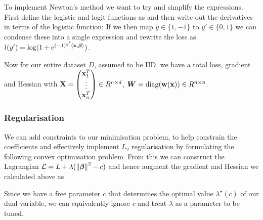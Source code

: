 \begin{appendices}
To implement Newton's method we want to try and simplify the expressions. First define the logistic and logit functions as
and then write out the derivatives in terms of the logistic function:
If we then map $y \in \{1,-1\}$ to $y' \in \{0,1\}$ we can condense these into a single expression
and rewrite the loss as $l(y') = \log(1+\mathrm{e}^{(-1)^{y'}\langle\mathbf{x},\bm{\beta}\rangle})$.

Now for our entire dataset $D$, assumed to be IID, we have a total loss, gradient and Hessian
with $\mathbf{X} = \begin{pmatrix} \mathbf{x}_1^T \\ \vdots \\ \mathbf{x}_n^T \end{pmatrix} \in R^{n\times d}$, $\bm{W} = \operatorname{diag}(\mathbf{w}(\mathbf{x})) \in R^{n\times n}$.

\subsubsection{Regularisation}
We can add constraints to our minimisation problem, to help constrain the coefficients and effectively implement $L_2$ regularisation by formulating the following convex optimisation problem.
From this we can construct the Lagrangian $\mathcal{L} = L + \lambda(\left\lVert\bm{\beta}\right\rVert^2 - c)$ and hence augment the gradient and Hessian we calculated above as

Since we have a free parameter $c$ that determines the optimal value $\lambda^\star(c)$ of our dual variable, we can equivalently ignore $c$ and treat $\lambda$ as a parameter to be tuned.


\end{appendices}
